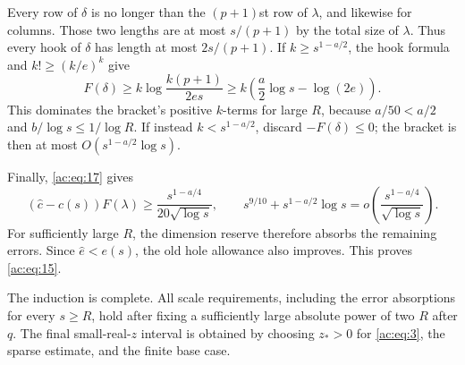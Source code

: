 Every row of \(\delta\) is no longer than the \((p+1)\)st row of
\(\lambda\), and likewise for columns. Those two lengths are at most
\(s/(p+1)\) by the total size of \(\lambda\). Thus every hook of \(\delta\) has length at
most \(2s/(p+1)\). If \(k\ge s^{1-a/2}\), the hook formula and
\(k!\ge(k/e)^k\) give
\[
 F(\delta)\ge
 k\log\frac{k(p+1)}{2es}
 \ge k\left(\frac a2\log s-\log(2e)\right).
\]
This dominates the bracket's positive \(k\)-terms for large \(R\),
because \(a/50<a/2\) and \(b/\log s\le1/\log R\). If instead
\(k<s^{1-a/2}\), discard \(-F(\delta)\le0\); the bracket is then at
most \(O(s^{1-a/2}\log s)\).

Finally, \eqref{ac:eq:17} gives
\[
 (\widehat c-c(s))F(\lambda)
 \ge\frac{s^{1-a/4}}{20\sqrt{\log s}},
 \qquad
 s^{9/10}+s^{1-a/2}\log s
 =o\!\left(\frac{s^{1-a/4}}{\sqrt{\log s}}\right).
\]
For sufficiently large \(R\), the dimension reserve therefore absorbs
the remaining errors. Since \(\widehat e<e(s)\), the old hole allowance
also improves. This proves \eqref{ac:eq:15}.

The induction is complete. All scale requirements, including the error
absorptions for every \(s\ge R\), hold after fixing a sufficiently large
absolute power of two \(R\) after \(q\). The final small-real-\(z\)
interval is obtained by choosing \(z_*>0\) for \eqref{ac:eq:3}, the sparse
estimate, and the finite base case.
